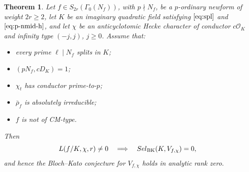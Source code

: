 \documentclass[10pt,letterpaper]{amsart}
\theoremstyle{plain}
\newtheorem{thm}{Theorem}[subsection] %
\theoremstyle{definition}
\theoremstyle{definition}
\theoremstyle{plain}
\theoremstyle{plain}
\theoremstyle{plain}
\theoremstyle{remark}
\numberwithin{equation}{section}
\newcommand{\Sel}{Sel}
\def\cO{\mathcal O}
\def\Sel{{\rm Sel}}
\begin{document}
\begin{thm}\label{thm:BK-indef}
Let $f\in S_{2r}(\Gamma_0(N_f))$, with $p\nmid N_f$, be a $p$-ordinary newform of weight $2r\geq 2$, let $K$ be an imaginary quadratic field satisfying $\eqref{eq:spl}$ and $\eqref{eq:p-nmid-h}$, and let $\chi$ be an anticyclotomic Hecke character of conductor $c\cO_K$ and infinity type $(-j,j)$, $j\geq 0$. 
Assume that:
\begin{itemize}
    \item every prime $\ell\mid N_f$ splits in $K$;
    \item $(pN_f,cD_K)=1$;
    \item $\chi_t$ has conductor prime-to-$p$;
    \item $\bar{\rho}_f$ is absolutely irreducible;
    \item $f$ is not of CM-type.
\end{itemize}
Then
\[
L(f/K,\chi,r)\neq 0\quad\Longrightarrow\quad\Sel_{\mathrm{BK}}(K,V_{f,\chi})=0,
\] 
and hence the Bloch--Kato conjecture for $V_{f,\chi}$ holds in analytic rank zero.
\end{thm}
\end{document}
